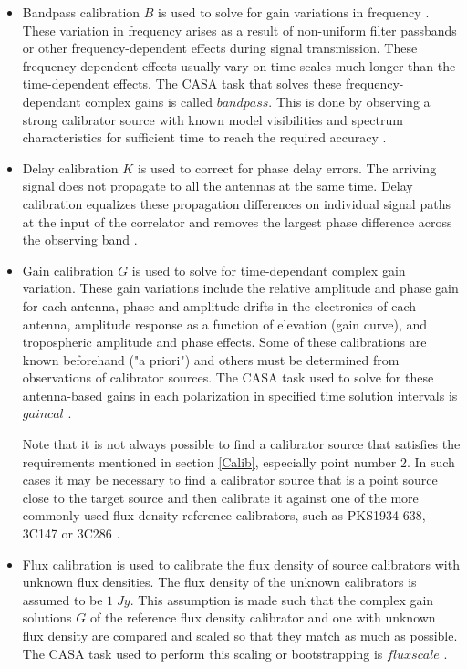 \begin{itemize}

\item Bandpass calibration $B$ is used to solve for gain variations
in frequency  \citep{CosmoAIMS}. These variation in frequency arises as a result of non-uniform filter passbands or other frequency-dependent effects during signal transmission. These frequency-dependent effects usually vary on time-scales much longer than the time-dependent effects. The CASA task that solves these frequency-dependant complex gains is called $\textit{bandpass}$. This is done by observing a strong calibrator source with known model visibilities and spectrum characteristics for sufficient time to reach the required accuracy \citep{taylor1999synthesis}.

\item Delay calibration $K$ is used to correct for phase delay errors. The arriving signal does not propagate to all the antennas at the same time. Delay calibration equalizes these propagation differences on individual signal paths at the input of the correlator and removes the largest phase difference across the observing band \citep{taylor1999synthesis}.   

\item Gain calibration $G$ is used to solve for time-dependant complex gain variation. These gain variations include the relative amplitude and phase gain for each antenna, phase and amplitude drifts in the electronics of each antenna, amplitude response as a function of elevation (gain curve), and tropospheric amplitude and phase effects. Some of these calibrations are known beforehand ("a priori") and others must be determined from observations of calibrator sources. The CASA task used to solve for these antenna-based gains in each polarization in specified time solution intervals  is $\textit{gaincal}$ \citep{editioncasa}.  

Note that it is not always possible to find a calibrator source that satisfies the requirements mentioned in section \ref{Calib}, especially point number 2. In such cases it may be necessary to find a calibrator source that is a point source  close to the target source and then calibrate it against one of the more commonly used flux density reference calibrators, such as PKS1934-638, 3C147 or 3C286 \citep{thompson2001interferometry}. 

\item Flux calibration is used to calibrate the flux density of source calibrators with unknown flux densities. The flux density of the unknown calibrators is assumed to be $1\;Jy$. This assumption is made such that the complex gain solutions $G$ of the reference flux density calibrator and one with unknown flux density are compared and scaled so that they match as much as possible. The CASA task used to perform this scaling or bootstrapping is $\textit{fluxscale}$ \citep{editioncasa}.
\end{itemize}

